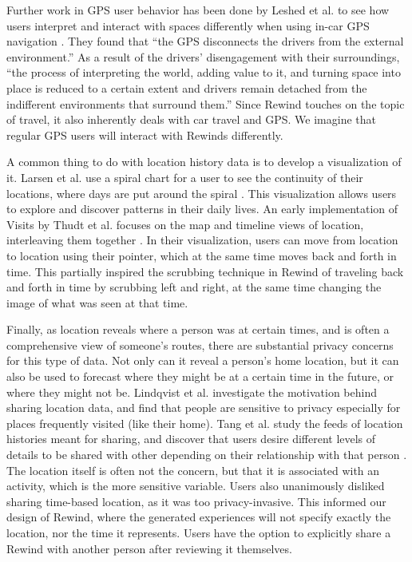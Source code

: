 \documentclass{sigchi}
\begin{document}
Further work in GPS user behavior has been done by Leshed et al. to see how users interpret and interact with spaces differently when using in-car GPS navigation \cite{leshed2008car}. They found that ``the GPS disconnects the drivers from the external environment.'' As a result of the drivers' disengagement with their surroundings, ``the process of interpreting the world, adding value to it, and turning space into place is reduced to a certain extent and drivers remain detached from the indifferent environments that surround them.'' Since Rewind touches on the topic of travel, it also inherently deals with car travel and GPS. We imagine that regular GPS users will interact with Rewinds differently.

A common thing to do with location history data is to develop a visualization of it. Larsen et al. use a spiral chart for a user to see the continuity of their locations, where days are put around the spiral \cite{larsen2013qs}. This visualization allows users to explore and discover patterns in their daily lives. An early implementation of Visits by Thudt et al. focuses on the map and timeline views of location, interleaving them together \cite{thudt2013visits}. In their visualization, users can move from location to location using their pointer, which at the same time moves back and forth in time. This partially inspired the scrubbing technique in Rewind of traveling back and forth in time by scrubbing left and right, at the same time changing the image of what was seen at that time.
 
Finally, as location reveals where a person was at certain times, and is often a comprehensive view of someone's routes, there are substantial privacy concerns for this type of data. Not only can it reveal a person's home location, but it can also be used to forecast where they might be at a certain time in the future, or where they might not be. Lindqvist et al. \cite{lindqvist2011m} investigate the motivation behind sharing location data, and find that people are sensitive to privacy especially for places frequently visited (like their home). Tang et al. study the feeds of location histories meant for sharing, and discover that users desire different levels of details to be shared with other depending on their relationship with that person \cite{tang2011understanding}. The location itself is often not the concern, but that it is associated with an activity, which is the more sensitive variable. Users also unanimously disliked sharing time-based location, as it was too privacy-invasive. This informed our design of Rewind, where the generated experiences will not specify exactly the location, nor the time it represents. Users have the option to explicitly share a Rewind with another person after reviewing it themselves.
\end{document}
